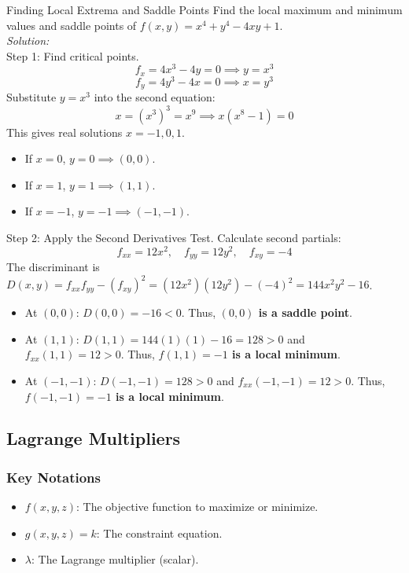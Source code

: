 \documentclass[11pt]{article}
\begin{document}
\begin{examplebox}{Finding Local Extrema and Saddle Points}
    Find the local maximum and minimum values and saddle points of $f(x,y) = x^4 + y^4 - 4xy + 1$.\\
    \textit{Solution:}\\
    Step 1: Find critical points.
    \[ f_x = 4x^3 - 4y = 0 \implies y = x^3 \]
    \[ f_y = 4y^3 - 4x = 0 \implies x = y^3 \]
    Substitute $y = x^3$ into the second equation:
    \[ x = (x^3)^3 = x^9 \implies x(x^8 - 1) = 0 \]
    This gives real solutions $x = -1, 0, 1$.
    \begin{itemize}
        \item If $x=0$, $y=0 \implies (0,0)$.
        \item If $x=1$, $y=1 \implies (1,1)$.
        \item If $x=-1$, $y=-1 \implies (-1,-1)$.
    \end{itemize}
    Step 2: Apply the Second Derivatives Test.
    Calculate second partials:
    \[ f_{xx} = 12x^2, \quad f_{yy} = 12y^2, \quad f_{xy} = -4 \]
    The discriminant is $D(x,y) = f_{xx}f_{yy} - (f_{xy})^2 = (12x^2)(12y^2) - (-4)^2 = 144x^2y^2 - 16$.
    \begin{itemize}
        \item At $(0,0)$: $D(0,0) = -16 < 0$. Thus, \textbf{$(0,0)$ is a saddle point}.
        \item At $(1,1)$: $D(1,1) = 144(1)(1) - 16 = 128 > 0$ and $f_{xx}(1,1) = 12 > 0$. Thus, \textbf{$f(1,1) = -1$ is a local minimum}.
        \item At $(-1,-1)$: $D(-1,-1) = 128 > 0$ and $f_{xx}(-1,-1) = 12 > 0$. Thus, \textbf{$f(-1,-1) = -1$ is a local minimum}.
    \end{itemize}
\end{examplebox}


\subsection{Lagrange Multipliers}
\subsubsection*{Key Notations}
\begin{itemize}
    \item $f(x,y,z)$: The objective function to maximize or minimize.
    \item $g(x,y,z) = k$: The constraint equation.
    \item $\lambda$: The Lagrange multiplier (scalar).
\end{itemize}
\end{document}
